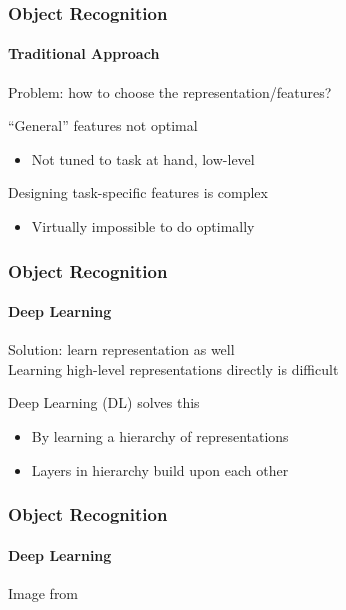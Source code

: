 \documentclass[xetex,professionalfont]{beamer}
\begin{document}
\begin{frame}
\frametitle{Object Recognition}
\framesubtitle{Traditional Approach}

Problem: how to choose the representation/features? %

\bigskip
\enquote{General} features not optimal
\begin{itemize}
	\item Not tuned to task at hand, low-level
\end{itemize}

\bigskip
Designing task-specific features is complex
\begin{itemize}
	\item Virtually impossible to do optimally
\end{itemize}

\end{frame}


\begin{frame}
\frametitle{Object Recognition}
\framesubtitle{Deep Learning}

Solution: learn representation as well\\\medskip %
Learning high-level representations directly is difficult

\bigskip
Deep Learning (DL) solves this
\begin{itemize}
	\item By learning a hierarchy of representations %
	\item Layers in hierarchy build upon each other %
\end{itemize}

\end{frame}


\begin{frame}
\frametitle{Object Recognition}
\framesubtitle{Deep Learning}

\begin{center}
	{\centering Image from \cite{bengio2014}}
\end{center}

\end{frame}
\end{document}
